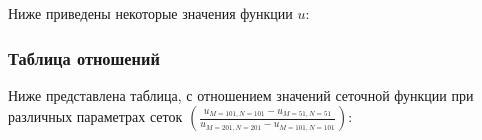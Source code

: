 \documentclass[a4paper,12pt]{article}
\begin{document}
Ниже приведены некоторые значения функции \(u\):


\subsubsection*{Таблица отношений}
Ниже представлена таблица, с отношением значений сеточной функции при различных параметрах сеток \(\left(\frac{u_{M=101,N=101}-u_{M=51,N=51}}{u_{M=201,N=201}-u_{M=101,N=101}}\right)\):


\end{document}
